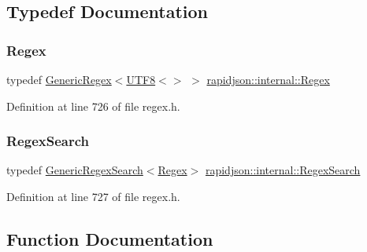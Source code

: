 \subsection{Typedef Documentation}
\mbox{\label{namespacerapidjson_1_1internal_a6e31418488a57106fa341bc0e6fe7960}} 
\subsubsection{\texorpdfstring{Regex}{Regex}}
{\footnotesize\ttfamily typedef \mbox{\hyperlink{classrapidjson_1_1internal_1_1_generic_regex}{Generic\+Regex}}$<$\mbox{\hyperlink{structrapidjson_1_1_u_t_f8}{U\+T\+F8}}$<$$>$ $>$ \mbox{\hyperlink{namespacerapidjson_1_1internal_a6e31418488a57106fa341bc0e6fe7960}{rapidjson\+::internal\+::\+Regex}}}



Definition at line 726 of file regex.\+h.

\mbox{\label{namespacerapidjson_1_1internal_a8790aa6e3fc1729f369b06cf84e76fae}} 
\subsubsection{\texorpdfstring{RegexSearch}{RegexSearch}}
{\footnotesize\ttfamily typedef \mbox{\hyperlink{classrapidjson_1_1internal_1_1_generic_regex_search}{Generic\+Regex\+Search}}$<$\mbox{\hyperlink{namespacerapidjson_1_1internal_a6e31418488a57106fa341bc0e6fe7960}{Regex}}$>$ \mbox{\hyperlink{namespacerapidjson_1_1internal_a8790aa6e3fc1729f369b06cf84e76fae}{rapidjson\+::internal\+::\+Regex\+Search}}}



Definition at line 727 of file regex.\+h.



\subsection{Function Documentation}
\mbox{\label{namespacerapidjson_1_1internal_a1c9faaa8ff1461a84ee35c04c7b926c5}} 
